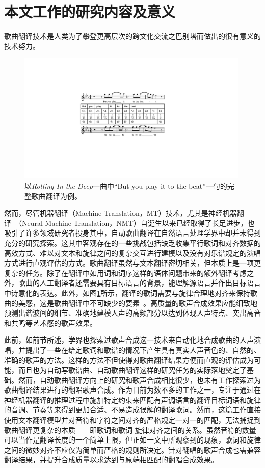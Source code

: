 \section{本文工作的研究内容及意义}
歌曲翻译技术是人类为了攀登更高层次的跨文化交流之巴别塔而做出的很有意义的技术努力。
\begin{figure}[htbp]
  \includegraphics[width=0.99\textwidth]{figure/ast/exp.pdf}
  \caption{以\textit{Rolling In the Deep}一曲中``But you play it to the beat''一句的完整歌曲翻译为例。}
  \label{fig:task_exp}
\end{figure}
然而，尽管机器翻译（Machine Translation，MT）技术，尤其是神经机器翻译~\citep{nmt,vaswani2017attention,hassan2018achieving}（Neural Machine Translation，NMT）自诞生以来已经取得了长足进步，也吸引了许多领域研究者投身其中，自动歌曲翻译在自然语言处理学界中却并未得到充分的研究探索。这其中客观存在的一些挑战包括缺乏收集平行歌词和对齐数据的高效方式、难以对文本和旋律之间的复杂交互进行建模以及没有对乐谱规定的演唱方式进行直观评估的方式。歌曲翻译虽然与文本翻译密切相关，但本质上是一项更复杂的任务。除了在翻译中如用词和词序这样的语体问题带来的额外翻译考虑之外，歌曲的人工翻译者还需要具有目标语言的背景，能理解源语言并作出目标语言中诗意化的表达。此外，如图\ref{fig:task_exp}所示，翻译的歌词需要与旋律合理地对齐来保持歌曲的美感，这是歌曲翻译中不可缺少的要素~\citep{three_d_of_singability}。高质量的歌声合成效果应能细致地预测出谐波间的细节、准确地建模人声的高频部分以达到体现人声特点、突出高音和共鸣等艺术感的歌声效果。

此前，如前节所述，学界也探索过歌声合成这一技术来自动化地合成歌曲的人声演唱，并提出了一些在给定歌词和歌谱的情况下产生具有真实人声音色的、自然的、准确的歌声的方法。这样的方法不但使得对歌曲翻译结果方便而直观的评估成为可能，而且也为自动写歌谱曲、自动歌曲翻译这样的研究任务的实际落地奠定了基础。然而，自动歌曲翻译方向上的研究和歌声合成相比很少，也未有工作探索过为歌曲翻译结果进行的翻唱歌声合成。作为目前为数不多的工作之一，\citet{gagast}专注于通过在神经机器翻译的推理过程中施加特定约束来匹配有声调语言的翻译目标词语和旋律的音调、节奏等来得到更加合适、不易造成误解的翻译歌词。然而，这篇工作直接使用文本翻译模型并对音符和字符之间对齐的严格规定一对一的匹配，无法捕捉到歌曲翻译更复杂的本质——即歌词和歌词-旋律对齐之间的关系。虽然音符的数量可以当作是翻译长度的一个简单上限，但正如\citet{interplay_lyrics_melody}一文中所观察到的现象，歌词和旋律之间的微妙对齐不应仅为简单而严格的规则所决定。针对翻唱的歌声合成也需兼容翻译结果，并提升合成质量以求达到与原端相匹配的翻唱合成效果。

